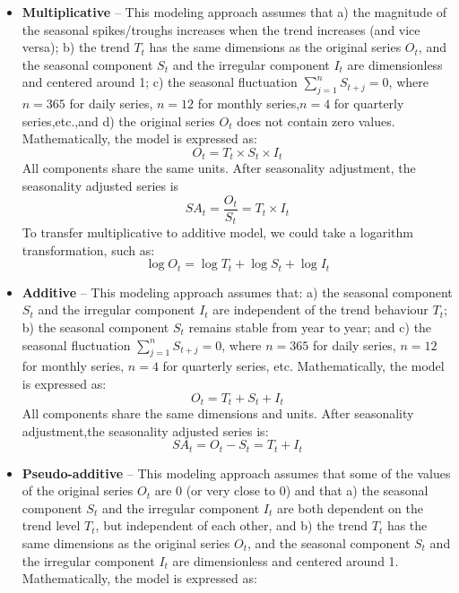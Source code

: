 \begin{itemize}[noitemsep]      
    \item \textbf{Multiplicative} -- This modeling approach assumes that a) the magnitude of the seasonal spikes/troughs increases when the trend increases (and vice versa); b) the trend $T_t$ has the same dimensions as the original series $O_t$, and the seasonal component $S_t$ and the irregular component $I_t$ are dimensionless and centered around 1; c)  the seasonal fluctuation  $\sum_{j=1}^{n} S_{t+j}=0 $, where $n = 365$ for daily series, $n=12$ for monthly series,$n=4$ for quarterly series,etc.,and d) the original series $O_t$ does not contain zero values. Mathematically, the model is expressed as:
    \begin{equation*}
        O_t = T_t \times S_t \times I_t
    \end{equation*}
   All components share the same units. After seasonality adjustment, the seasonality adjusted series is
   \begin{equation*}
       SA_t = \frac{O_t}{S_t} = T_t \times I_t
   \end{equation*}
   To transfer multiplicative to additive model, we could take a logarithm transformation, such as:
   \begin{equation*}
       \log{O_t} = \log{T_t}+\log{S_t}+\log{I_t}
   \end{equation*}
    \item \textbf{Additive} -- This modeling approach assumes that: a) the seasonal component $S_t$ and the irregular component $I_t$ are independent of the trend behaviour $T_t$; b) the seasonal component $S_t$ remains stable from year to year; and c) the seasonal fluctuation $\sum_{j=1}^{n} S_{t+j}=0 $, where $n=365$ for daily series, $n=12$ for monthly series, $n=4$ for quarterly series, etc. Mathematically, the model is expressed as:
    \begin{equation*}
        O_t = T_t + S_t + I_t
    \end{equation*}
    All components share the same dimensions and units. After seasonality adjustment,the seasonality adjusted series is:
    \begin{equation*}
        SA_t = O_t - S_t = T_t + I_t
    \end{equation*}
    \item \textbf{Pseudo-additive} -- This modeling approach assumes that some of the values of the original series $O_t$ are 0 (or very close to 0) and that a) the seasonal component $S_t$ and the irregular component $I_t$ are both dependent on the trend level $T_t$, but independent of each other, and b) the trend $T_t$ has the same dimensions as the original series $O_t$, and the seasonal component $S_t$ and the irregular component $I_t$ are dimensionless and centered around 1.  Mathematically, the model is expressed as:

\end{itemize}
